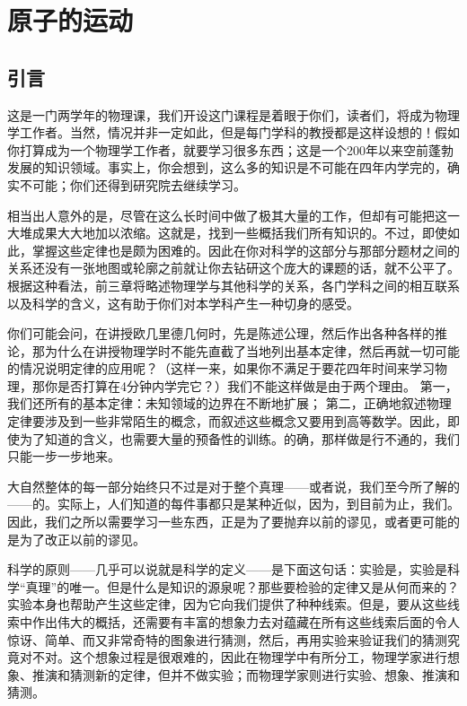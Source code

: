 \chapter{原子的运动}

\section{引言}

这是一门两学年的物理课，我们开设这门课程是着眼于你们，读者们，将成为物理学工作者。当然，情况并非一定如此，但是每门学科的教授都是这样设想的！假如你打算成为一个物理学工作者，就要学习很多东西；这是一个200年以来空前蓬勃发展的知识领域。事实上，你会想到，这么多的知识是不可能在四年内学完的，确实不可能；你们还得到研究院去继续学习。

相当出人意外的是，尽管在这么长时间中做了极其大量的工作，但却有可能把这一大堆成果大大地加以浓缩。这就是，找到一些概括我们所有知识的。不过，即使如此，掌握这些定律也是颇为困难的。因此在你对科学的这部分与那部分题材之间的关系还没有一张地图或轮廓之前就让你去钻研这个庞大的课题的话，就不公平了。根据这种看法，前三章将略述物理学与其他科学的关系，各门学科之间的相互联系以及科学的含义，这有助于你们对本学科产生一种切身的感受。

你们可能会问，在讲授欧几里德几何时，先是陈述公理，然后作出各种各样的推论，那为什么在讲授物理学时不能先直截了当地列出基本定律，然后再就一切可能的情况说明定律的应用呢？（这样一来，如果你不满足于要花四年时间来学习物理，那你是否打算在4分钟内学完它？）我们不能这样做是由于两个理由。 第一，我们还所有的基本定律：未知领域的边界在不断地扩展； 第二，正确地叙述物理定律要涉及到一些非常陌生的概念，而叙述这些概念又要用到高等数学。因此，即使为了知道的含义，也需要大量的预备性的训练。的确，那样做是行不通的，我们只能一步一步地来。

大自然整体的每一部分始终只不过是对于整个真理——或者说，我们至今所了解的——的。实际上，人们知道的每件事都只是某种近似，因为，到目前为止，我们。因此，我们之所以需要学习一些东西，正是为了要抛弃以前的谬见，或者更可能的是为了改正以前的谬见。

科学的原则——几乎可以说就是科学的定义——是下面这句话：实验是，实验是科学“真理”的唯一。但是什么是知识的源泉呢？那些要检验的定律又是从何而来的？实验本身也帮助产生这些定律，因为它向我们提供了种种线索。但是，要从这些线索中作出伟大的概括，还需要有丰富的想象力去对蕴藏在所有这些线索后面的令人惊讶、简单、而又非常奇特的图象进行猜测，然后，再用实验来验证我们的猜测究竟对不对。这个想象过程是很艰难的，因此在物理学中有所分工，物理学家进行想象、推演和猜测新的定律，但并不做实验；而物理学家则进行实验、想象、推演和猜测。

